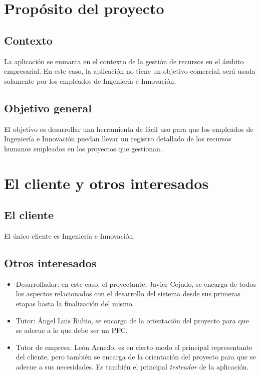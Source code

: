 \section{Propósito del proyecto}

\subsection{Contexto}

La aplicación se enmarca en el contexto de la gestión de recursos en el ámbito
empresarial. En este caso, la aplicación no tiene un objetivo comercial, será
usada solamente por los empleados de Ingeniería e Innovación.

\subsection{Objetivo general}

El objetivo es desarrollar una herramienta de fácil uso para que los empleados
de Ingeniería e Innovación puedan llevar un registro detallado de los recursos
humanos empleados en los proyectos que gestionan.

\section{El cliente y otros interesados}

\subsection{El cliente}

El único cliente es Ingeniería e Innovación.

\subsection{Otros interesados}

\begin{itemize}
 \item Desarrollador: en este caso, el proyectante, Javier Cejudo, se encarga
de todos los aspectos relacionados con el desarrollo del sistema desde sus
primeras etapas hasta la finalización del mismo.

\item Tutor: Ángel Luis Rubio, se encarga de la orientación del proyecto para
que se adecue a lo que debe ser un PFC.

\item Tutor de empresa: León Arnedo, es en cierto modo el principal
representante del cliente, pero también se encarga de la orientación del
proyecto para que se adecue a sus necesidades.
Es también el principal \textit{testeador} de la aplicación.
\end{itemize}


